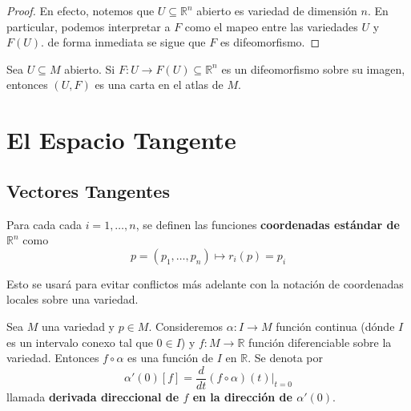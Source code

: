 \documentclass[12pt]{report}
\theoremstyle{largebreak}
\begin{document}
    \begin{proof}
        En efecto, notemos que $U\subseteq\mathbb{R}^n$ abierto es variedad de dimensión $n$. En particular, podemos interpretar a $F$ como el mapeo entre las variedades $U$ y $F(U)$. de forma inmediata se sigue que $F$ es difeomorfismo.
    \end{proof}

    \begin{propo}
        Sea $U\subseteq M$ abierto. Si $F:U\rightarrow F(U)\subseteq\mathbb{R}^n$ es un difeomorfismo sobre su imagen, entonces $(U,F)$ es una carta en el atlas de $M$.
    \end{propo}

    \setcounter{chapter}{7}
    \chapter{El Espacio Tangente}

    \section{Vectores Tangentes}


    \begin{mydef}
        Para cada cada $i=1,\dots,n$, se definen las funciones \textbf{coordenadas estándar de $\mathbb{R}^n$} como
        \begin{equation*}
            p=(p_1,\dots, p_n)\mapsto r_i(p)=p_i
        \end{equation*}
    \end{mydef}

    Esto se usará para evitar conflictos más adelante con la notación de coordenadas locales sobre una variedad.

    \begin{mydef}
        Sea $M$ una variedad y $p\in M$. Consideremos $\alpha:I\rightarrow M$ función continua (dónde $I$ es un intervalo conexo tal que $0\in I$) y $f:M\rightarrow \mathbb{R}$ función diferenciable sobre la variedad. Entonces $f\circ \alpha$ es una función de $I$ en $\mathbb{R}$. Se denota por
        \begin{equation*}
            \alpha'(0)[f]=\frac{d}{dt}(f\circ\alpha)(t)\Big|_{t=0}
        \end{equation*}
        llamada \textbf{derivada direccional de $f$ en la dirección de $\alpha'(0)$}.
    \end{mydef}
\end{document}
